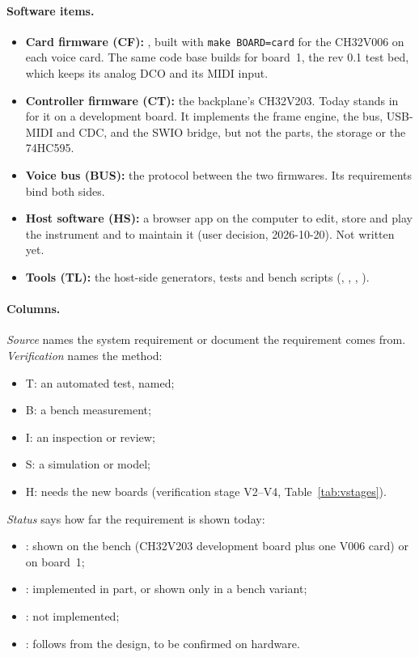 \paragraph{Software items.}
\begin{itemize}
  \item \textbf{Card firmware (CF):} , built with \texttt{make BOARD=card} for the CH32V006 on each
    voice card. The same code base builds for board~1, the rev 0.1 test bed, which keeps its analog DCO and its MIDI
    input.
  \item \textbf{Controller firmware (CT):} the backplane's CH32V203. Today  stands in for it
    on a development board. It implements the frame engine, the bus, USB-MIDI and CDC, and the SWIO bridge, but not
    the parts, the storage or the 74HC595.
  \item \textbf{Voice bus (BUS):} the protocol between the two firmwares. Its requirements bind both sides.
  \item \textbf{Host software (HS):} a browser app on the computer to edit, store and play the instrument and to
    maintain it (user decision, 2026-10-20). Not written yet.
  \item \textbf{Tools (TL):} the host-side generators, tests and bench scripts (,
    , , ).
\end{itemize}

\paragraph{Columns.} \emph{Source} names the system requirement or document the requirement comes from.
\emph{Verification} names the method:
\begin{itemize}
  \item T: an automated test, named;
  \item B: a bench measurement;
  \item I: an inspection or review;
  \item S: a simulation or model;
  \item H: needs the new boards (verification stage V2--V4, Table~\ref{tab:vstages}).
\end{itemize}
\emph{Status} says how far the requirement is shown today:
\begin{itemize}
  \item \stmet: shown on the bench (CH32V203 development board plus one V006 card) or on board~1;
  \item \stpart: implemented in part, or shown only in a bench variant;
  \item \stopen: not implemented;
  \item \stdes: follows from the design, to be confirmed on hardware.
\end{itemize}

